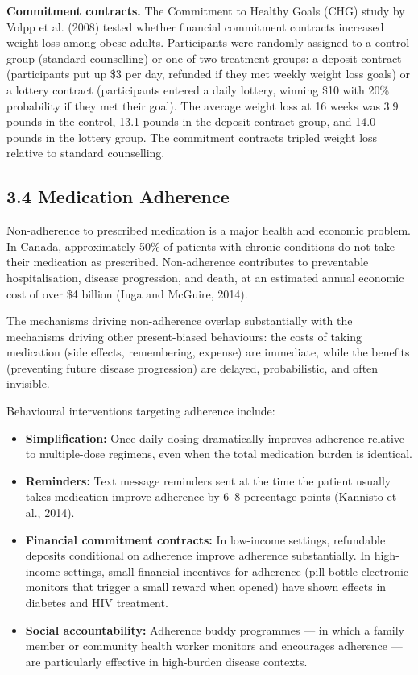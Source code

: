 \documentclass[12pt, letterpaper]{article}
\begin{document}
\textbf{Commitment contracts.} The Commitment to Healthy Goals (CHG) study by Volpp et al. (2008) tested whether financial commitment contracts increased weight loss among obese adults. Participants were randomly assigned to a control group (standard counselling) or one of two treatment groups: a deposit contract (participants put up \$3 per day, refunded if they met weekly weight loss goals) or a lottery contract (participants entered a daily lottery, winning \$10 with 20\% probability if they met their goal). The average weight loss at 16 weeks was 3.9 pounds in the control, 13.1 pounds in the deposit contract group, and 14.0 pounds in the lottery group. The commitment contracts tripled weight loss relative to standard counselling.


\subsection{3.4 Medication Adherence}


Non-adherence to prescribed medication is a major health and economic problem. In Canada, approximately 50\% of patients with chronic conditions do not take their medication as prescribed. Non-adherence contributes to preventable hospitalisation, disease progression, and death, at an estimated annual economic cost of over \$4 billion (Iuga and McGuire, 2014).

The mechanisms driving non-adherence overlap substantially with the mechanisms driving other present-biased behaviours: the costs of taking medication (side effects, remembering, expense) are immediate, while the benefits (preventing future disease progression) are delayed, probabilistic, and often invisible.

Behavioural interventions targeting adherence include:
\begin{itemize}
\item \textbf{Simplification:} Once-daily dosing dramatically improves adherence relative to multiple-dose regimens, even when the total medication burden is identical.
\item \textbf{Reminders:} Text message reminders sent at the time the patient usually takes medication improve adherence by 6--8 percentage points (Kannisto et al., 2014).
\item \textbf{Financial commitment contracts:} In low-income settings, refundable deposits conditional on adherence improve adherence substantially. In high-income settings, small financial incentives for adherence (pill-bottle electronic monitors that trigger a small reward when opened) have shown effects in diabetes and HIV treatment.
\item \textbf{Social accountability:} Adherence buddy programmes --- in which a family member or community health worker monitors and encourages adherence --- are particularly effective in high-burden disease contexts.
\end{itemize}
\end{document}
